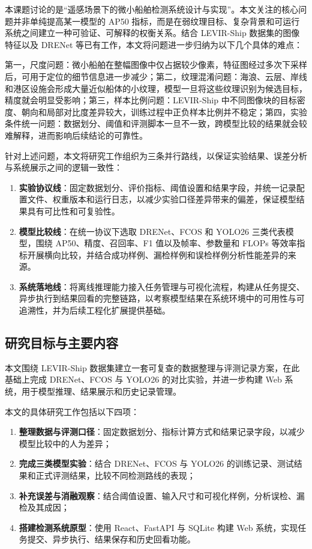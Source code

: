 本课题讨论的是“遥感场景下的微小船舶检测系统设计与实现”。本文关注的核心问题并非单纯提高某一模型的 AP50 指标，而是在弱纹理目标、复杂背景和可运行系统之间建立一种可验证、可解释的权衡关系。结合 LEVIR-Ship 数据集的图像特征以及 DRENet 等已有工作\cite{chen2022_tinyship_drenet}，本文将问题进一步归纳为以下几个具体的难点：

第一，尺度问题：微小船舶在整幅图像中仅占据较少像素，特征图经过多次下采样后，可用于定位的细节信息进一步减少；第二，纹理混淆问题：海浪、云层、岸线和港区设施会形成大量近似船体的小纹理，模型一旦将这些纹理识别为候选目标，精度就会明显受影响；第三，样本比例问题：LEVIR-Ship 中不同图像块的目标密度、朝向和局部对比度差异较大，训练过程中正负样本比例并不稳定；第四，实验条件统一问题：数据划分、阈值和评测脚本一旦不一致，跨模型比较的结果就会较难解释，进而影响后续结论的可靠性。

针对上述问题，本文将研究工作组织为三条并行路线，以保证实验结果、误差分析与系统展示之间的逻辑一致性：

\begin{enumerate}[label=（\arabic*）, leftmargin=3em]
  \item \textbf{实验协议线}：固定数据划分、评价指标、阈值设置和结果字段，并统一记录配置文件、权重版本和运行日志，以减少实验口径差异带来的偏差，保证模型结果具有可比性和可复验性。
  \item \textbf{模型比较线}：在统一协议下选取 DRENet、FCOS 和 YOLO26 三类代表模型，围绕 AP50、精度、召回率、F1 值以及帧率、参数量和 FLOPs 等效率指标开展横向比较，并结合成功样例、漏检样例和误检样例分析性能差异的来源。
  \item \textbf{系统落地线}：将离线推理能力接入任务管理与可视化流程，构建从任务提交、异步执行到结果回看的完整链路，以考察模型结果在系统环境中的可用性与可追溯性，并为后续工程化扩展提供基础。

\end{enumerate}

\subsection{研究目标与主要内容}

本文围绕 LEVIR-Ship 数据集建立一套可复查的数据整理与评测记录方案，在此基础上完成 DRENet、FCOS 与 YOLO26 的对比实验，并进一步构建 Web 系统，用于模型推理、结果展示和历史记录管理。

本文的具体研究工作包括以下四项：

\begin{enumerate}[label=（\arabic*）, leftmargin=3em]
      \item \textbf{整理数据与评测口径}：固定数据划分、指标计算方式和结果记录字段，以减少模型比较中的人为差异；
      \item \textbf{完成三类模型实验}：结合 DRENet、FCOS 与 YOLO26 的训练记录、测试结果和正式评测结果，比较不同检测路线的表现；
      \item \textbf{补充误差与消融观察}：结合阈值设置、输入尺寸和可视化样例，分析误检、漏检及其成因；
      \item \textbf{搭建检测系统原型}：使用 React、FastAPI 与 SQLite 构建 Web 系统，实现任务提交、异步执行、结果保存和历史回看功能。
\end{enumerate}

